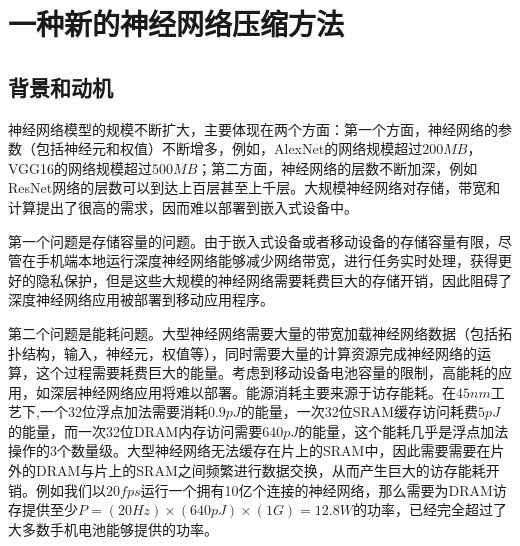 \chapter{一种新的神经网络压缩方法}




\section{背景和动机}
神经网络模型的规模不断扩大，主要体现在两个方面：第一个方面，神经网络的参数（包括神经元和权值）不断增多，例如，AlexNet的网络规模超过$200MB$，VGG16的网络规模超过$500MB$；第二方面，神经网络的层数不断加深，例如ResNet网络的层数可以到达上百层甚至上千层。大规模神经网络对存储，带宽和计算提出了很高的需求，因而难以部署到嵌入式设备中。

第一个问题是存储容量的问题。由于嵌入式设备或者移动设备的存储容量有限，尽管在手机端本地运行深度神经网络能够减少网络带宽，进行任务实时处理，获得更好的隐私保护，但是这些大规模的神经网络需要耗费巨大的存储开销，因此阻碍了深度神经网络应用被部署到移动应用程序。

第二个问题是能耗问题。大型神经网络需要大量的带宽加载神经网络数据（包括拓扑结构，输入，神经元，权值等），同时需要大量的计算资源完成神经网络的运算，这个过程需要耗费巨大的能量。考虑到移动设备电池容量的限制，高能耗的应用，如深层神经网络应用将难以部署。能源消耗主要来源于访存能耗。在$45nm$工艺下,一个32位浮点加法需要消耗$0.9pJ$的能量，一次32位SRAM缓存访问耗费$5pJ$的能量，而一次32位DRAM内存访问需要$640pJ$的能量，这个能耗几乎是浮点加法操作的3个数量级。大型神经网络无法缓存在片上的SRAM中，因此需要需要在片外的DRAM与片上的SRAM之间频繁进行数据交换，从而产生巨大的访存能耗开销。例如我们以$20fps$运行一个拥有10亿个连接的神经网络，那么需要为DRAM访存提供至少$P = (20Hz)\times (640pJ)\times (1G) = 12.8W$的功率，已经完全超过了大多数手机电池能够提供的功率。

